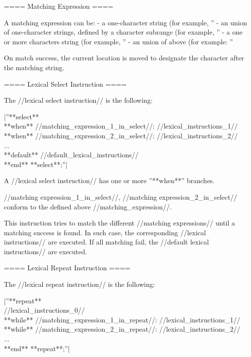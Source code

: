 {==== Matching Expression ====

A matching expression can be:
  - a one-character string (for example, ''%
  - an union of one-character strings, defined by a character subrange (for example, ''%
  - a one or more characters string (for example, ''%
  - an union of above (for example: ''%

On match success, the current location is moved to designate the character after the matching string.

==== Lexical Select Instruction ====

The //lexical select instruction// is the following:

|''**select**\\ **when** //matching\_expression\_1\_in\_select//: //lexical\_instructions\_1//\\ **when** //matching\_expression\_2\_in\_select//: //lexical\_instructions\_2//\\ ...\\ **default** //default\_lexical\_instructions//\\ **end** **select**;''|

A //lexical select instruction// has one or more ''**when**'' branches.

//matching expression\_1\_in\_select//, //matching expression\_2\_in\_select// conform to the defined above //matching\_expression//.

This instruction tries to match the different //matching expressions// until a matching success is found. In such case, the corresponding //lexical instructions// are executed. If all matching fail, the //default lexical instructions// are executed.

==== Lexical Repeat Instruction ====

The //lexical repeat instruction// is the following:

|''**repeat**\\  //lexical\_instructions\_0//\\ **while** //matching\_expression\_1\_in\_repeat//: //lexical\_instructions\_1//\\ **while** //matching\_expression\_2\_in\_repeat//: //lexical\_instructions\_2//\\ ...\\ **end** **repeat**;''|

}

